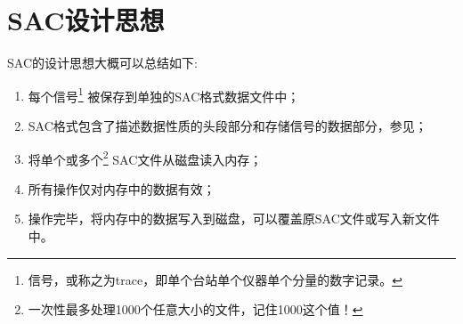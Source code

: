 \section{SAC设计思想}
SAC的设计思想大概可以总结如下:
\begin{enumerate}
\item 每个信号\footnote{信号，或称之为trace，即单个台站单个仪器单个分量的数字记录。}
被保存到单独的SAC格式数据文件中；
\item SAC格式包含了描述数据性质的头段部分和存储信号的数据部分，参见；
\item 将单个或多个\footnote{一次性最多处理1000个任意大小的文件，记住1000这个值！}
    SAC文件从磁盘读入内存；
\item 所有操作仅对内存中的数据有效；
\item 操作完毕，将内存中的数据写入到磁盘，可以覆盖原SAC文件或写入新文件中。
\end{enumerate}
